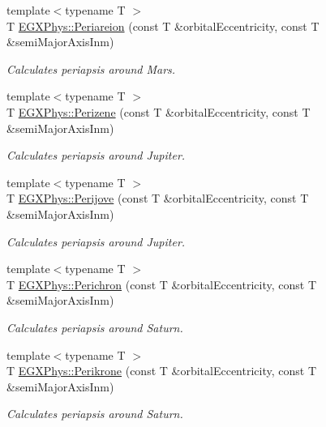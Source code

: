 \begin{DoxyCompactItemize}
{\footnotesize template$<$typename T $>$ }\\T \mbox{\hyperlink{group___e_g_x_phys-_periapsis_ga27fbf6beeae240a9eeea35dae65b089a}{E\+G\+X\+Phys\+::\+Periareion}} (const T \&orbital\+Eccentricity, const T \&semi\+Major\+Axis\+Inm)
\begin{DoxyCompactList}\small\item\em Calculates periapsis around Mars. \end{DoxyCompactList}\item 
{\footnotesize template$<$typename T $>$ }\\T \mbox{\hyperlink{group___e_g_x_phys-_periapsis_ga8899642f7f872817c611240819b2b968}{E\+G\+X\+Phys\+::\+Perizene}} (const T \&orbital\+Eccentricity, const T \&semi\+Major\+Axis\+Inm)
\begin{DoxyCompactList}\small\item\em Calculates periapsis around Jupiter. \end{DoxyCompactList}\item 
{\footnotesize template$<$typename T $>$ }\\T \mbox{\hyperlink{group___e_g_x_phys-_periapsis_gae1daec11bd7b479853ba92ca6368a23c}{E\+G\+X\+Phys\+::\+Perijove}} (const T \&orbital\+Eccentricity, const T \&semi\+Major\+Axis\+Inm)
\begin{DoxyCompactList}\small\item\em Calculates periapsis around Jupiter. \end{DoxyCompactList}\item 
{\footnotesize template$<$typename T $>$ }\\T \mbox{\hyperlink{group___e_g_x_phys-_periapsis_gae8dfb0b7ebcd117ba94f2d1a7b2e13ad}{E\+G\+X\+Phys\+::\+Perichron}} (const T \&orbital\+Eccentricity, const T \&semi\+Major\+Axis\+Inm)
\begin{DoxyCompactList}\small\item\em Calculates periapsis around Saturn. \end{DoxyCompactList}\item 
{\footnotesize template$<$typename T $>$ }\\T \mbox{\hyperlink{group___e_g_x_phys-_periapsis_ga6b7ae332e74a35cd2c116b4a58204f4b}{E\+G\+X\+Phys\+::\+Perikrone}} (const T \&orbital\+Eccentricity, const T \&semi\+Major\+Axis\+Inm)
\begin{DoxyCompactList}\small\item\em Calculates periapsis around Saturn. \end{DoxyCompactList}\item 

\end{DoxyCompactItemize}
